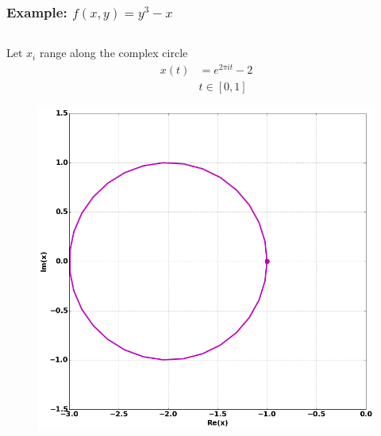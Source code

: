 \documentclass{beamer}
\begin{document}
\begin{frame}
  \frametitle{Example: $f(x,y) = y^3 - x$}
  \begin{columns}
  \begin{column}{0.3\textwidth}
    Let $x_i$ range along the complex circle
    {\small
    \begin{align*}
      x(t) &= e^{2 \pi i t} - 2 \\
      & t \in [0,1]
    \end{align*}
    }

    \begin{figure}
      \centering
      \includegraphics[width=1.2\textwidth]{images/ancontsimplex2.png}
    \end{figure}
  \end{column}


\end{columns}
\end{frame}
\end{document}

